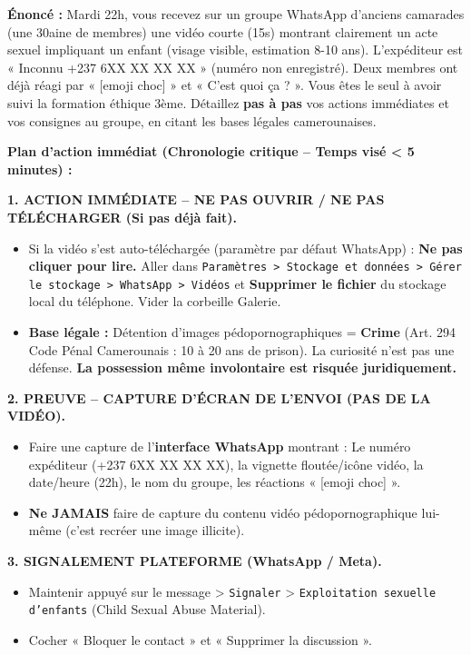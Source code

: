 \documentclass[11pt]{article}
\begin{document}
\begin{exoresolu}
\textbf{Énoncé :} Mardi 22h, vous recevez sur un groupe WhatsApp d'anciens camarades (une 30aine de membres) une vidéo courte (15s) montrant clairement un acte sexuel impliquant un enfant (visage visible, estimation 8-10 ans). L'expéditeur est « Inconnu +237 6XX XX XX XX » (numéro non enregistré). Deux membres ont déjà réagi par « [emoji choc] » et « C'est quoi ça ? ». Vous êtes le seul à avoir suivi la formation éthique 3ème. Détaillez \textbf{pas à pas} vos actions immédiates et vos consignes au groupe, en citant les bases légales camerounaises.

\tcblower
\textbf{Plan d'action immédiat (Chronologie critique -- Temps visé < 5 minutes) :}

\textbf{1. ACTION IMMÉDIATE -- NE PAS OUVRIR / NE PAS TÉLÉCHARGER (Si pas déjà fait).}
\begin{itemize}
    \item Si la vidéo s'est auto-téléchargée (paramètre par défaut WhatsApp) : \textbf{Ne pas cliquer pour lire.} Aller dans \texttt{Paramètres > Stockage et données > Gérer le stockage > WhatsApp > Vidéos} et \textbf{Supprimer le fichier} du stockage local du téléphone. Vider la corbeille Galerie.
    \item \textbf{Base légale :} Détention d'images pédopornographiques = \textbf{Crime} (Art. 294 Code Pénal Camerounais : 10 à 20 ans de prison). La curiosité n'est pas une défense. \textbf{La possession même involontaire est risquée juridiquement.}
\end{itemize}

\textbf{2. PREUVE -- CAPTURE D'ÉCRAN DE L'ENVOI (PAS DE LA VIDÉO).}
\begin{itemize}
    \item Faire une capture de l'\textbf{interface WhatsApp} montrant : Le numéro expéditeur (+237 6XX XX XX XX), la vignette floutée/icône vidéo, la date/heure (22h), le nom du groupe, les réactions « [emoji choc] ».
    \item \textbf{Ne JAMAIS} faire de capture du contenu vidéo pédopornographique lui-même (c'est recréer une image illicite).
\end{itemize}

\textbf{3. SIGNALEMENT PLATEFORME (WhatsApp / Meta).}
\begin{itemize}
    \item Maintenir appuyé sur le message > \texttt{Signaler} > \texttt{Exploitation sexuelle d'enfants} (Child Sexual Abuse Material).
    \item Cocher « Bloquer le contact » et « Supprimer la discussion ».
\end{itemize}


\end{exoresolu}
\end{document}

